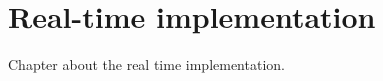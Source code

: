 \chapter{Real-time implementation}
\label{chp:realtime_implementation}

Chapter about the real time implementation.